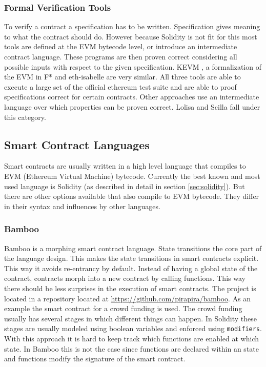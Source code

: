 \documentclass[a4paper]{article}
\begin{document}
\subsubsection{Formal Verification Tools}
To verify a contract a specification has to be written. Specification gives meaning to what the contract should do. However because Solidity is not fit for this most tools are defined at the EVM bytecode level, or introduce an intermediate contract language. These programs are then proven correct considering all possible inputs with respect to the given specification. KEVM \cite{hildenbrandt2017kevm}, a formalization of the EVM in F* \cite{grishchenko2018semantic} and eth-isabelle \cite{hirai2017defining} are very similar. All three tools are able to execute a large set of the official ethereum test suite and are able to proof specifications correct for certain contracts. Other approaches use an intermediate language over which properties can be proven correct. Lolisa \cite{yang2018lolisa} and Scilla \cite{sergey2018scilla} fall under this category. 

\subsection{Smart Contract Languages}
Smart contracts are usually written in a high level language that compiles to EVM (Ethereum Virtual Machine) bytecode. Currently the best known and most used language is Solidity (as described in detail in section \ref{sec:solidity}). But there are other options available that also compile to EVM bytecode. They differ in their syntax and influences by other languages.  
\subsubsection{Bamboo}
Bamboo is a morphing smart contract language. State transitions the core part of the language design. This makes the state transitions in smart contracts explicit. This way it avoids re-entrancy by default. Instead of having a global state of the contract, contracts morph into a new contract by calling functions. This way there should be less surprises in the execution of smart contracts. The project is located in a repository located at \url{https://github.com/pirapira/bamboo}. As an example the smart contract for a crowd funding is used. The crowd funding usually has several stages in which different things can happen. In Solidity these stages are usually modeled using boolean variables and enforced using \texttt{modifiers}. With this approach it is hard to keep track which functions are enabled at which state. In Bamboo this is not the case since functions are declared within an state and functions modify the signature of the smart contract. 
\end{document}
